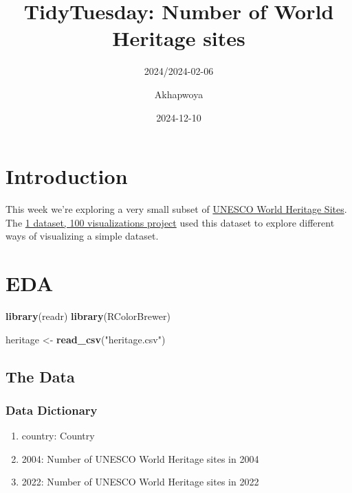 \documentclass[
]{article}
\title{TidyTuesday: Number of World Heritage sites}
\subtitle{2024/2024-02-06}
\author{Akhapwoya}
\date{2024-12-10}
\newenvironment{Shaded}{\begin{snugshade}}{\end{snugshade}}
\newcommand{\FunctionTok}[1]{\textcolor[rgb]{0.13,0.29,0.53}{\textbf{#1}}}
\newcommand{\NormalTok}[1]{#1}
\newcommand{\OtherTok}[1]{\textcolor[rgb]{0.56,0.35,0.01}{#1}}
\newcommand{\StringTok}[1]{\textcolor[rgb]{0.31,0.60,0.02}{#1}}
\providecommand{\tightlist}{%
  \setlength{\itemsep}{0pt}\setlength{\parskip}{0pt}}
\begin{document}
\maketitle

{
\hypersetup{linkcolor=}
\setcounter{tocdepth}{6}
\tableofcontents
}
\newpage

\section{Introduction}\label{introduction}

This week we're exploring a very small subset of
\href{https://whc.unesco.org/en/list}{UNESCO World Heritage Sites}. The
\href{https://100.datavizproject.com/}{1 dataset, 100 visualizations
project} used this dataset to explore different ways of visualizing a
simple dataset.

\section{EDA}\label{eda}

\begin{Shaded}
\begin{Highlighting}[numbers=left,,]
\FunctionTok{library}\NormalTok{(readr)}
\FunctionTok{library}\NormalTok{(RColorBrewer)}
\end{Highlighting}
\end{Shaded}

\begin{Shaded}
\begin{Highlighting}[numbers=left,,]
\NormalTok{heritage }\OtherTok{\textless{}{-}} \FunctionTok{read\_csv}\NormalTok{(}\StringTok{"heritage.csv"}\NormalTok{)}
\end{Highlighting}
\end{Shaded}

\subsection{The Data}\label{the-data}

\subsubsection{Data Dictionary}\label{data-dictionary}

\begin{enumerate}
\def\labelenumi{\arabic{enumi}.}
\tightlist
\item
  country: Country
\item
  2004: Number of UNESCO World Heritage sites in 2004
\item
  2022: Number of UNESCO World Heritage sites in 2022
\end{enumerate}
\end{document}
